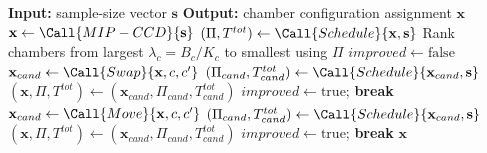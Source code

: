 \begin{algorithm}[H]
\caption{\textsc{ChamberAssignment}()}
\label{alg:chamber_assignment}
\begin{algorithmic}[1]
\State \textbf{Input:} sample-size vector \(\mathbf{s}\)
\State \textbf{Output:} chamber configuration assignment \(\mathbf{x}\)
\State \(\mathbf{x}\leftarrow\Call{MIP-CCD}{\mathbf{s}}\) \label{step:ca-exact}
\State \((\Pi,T^{tot})\leftarrow\Call{Schedule}{\mathbf{x},\mathbf{s}}\) \label{step:ca-eval}
\Repeat
    \State Rank chambers from largest \(\lambda_c=B_c/K_c\) to smallest using \(\Pi\) \label{step:ca-rank}
    \State \(\mathit{improved}\leftarrow\mathrm{false}\)
        \State \(\mathbf{x}_{cand}\leftarrow\Call{Swap}{\mathbf{x},c,c'}\)  \label{step:ca-swap}
            \State \((\Pi_{cand},T^{tot}_{cand})\leftarrow\Call{Schedule}{\mathbf{x}_{cand},\mathbf{s}}\)
                \State \((\mathbf{x},\Pi,T^{tot})\leftarrow(\mathbf{x}_{cand},\Pi_{cand},T^{tot}_{cand})\) \label{step:ca-accept}
                \State \(\mathit{improved}\leftarrow\mathrm{true}\); \textbf{break}
            \EndIf
        \EndIf
    \EndFor
            \State \(\mathbf{x}_{cand}\leftarrow\Call{Move}{\mathbf{x},c,c'}\)  \label{step:ca-move}
                \State \((\Pi_{cand},T^{tot}_{cand})\leftarrow\Call{Schedule}{\mathbf{x}_{cand},\mathbf{s}}\)
                    \State \((\mathbf{x},\Pi,T^{tot})\leftarrow(\mathbf{x}_{cand},\Pi_{cand},T^{tot}_{cand})\)
                    \State \(\mathit{improved}\leftarrow\mathrm{true}\); \textbf{break}
                \EndIf
            \EndIf
        \EndFor
    \EndIf
{} \label{step:ca-stop}
\State \Return \(\mathbf{x}\)
\end{algorithmic}
\end{algorithm}

